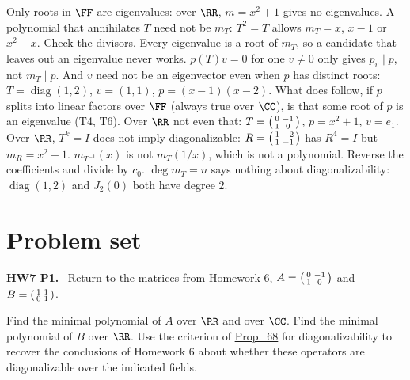 \documentclass[10pt]{scrartcl}
\begin{document}
\begin{trapbox}
  \ii Only roots in $\FF$ are eigenvalues: over $\RR$, $m=x^2+1$ gives no eigenvalues.
  \ii A polynomial that annihilates $T$ need not be $m_T$: $T^2=T$ allows $m_T=x$, $x-1$ or $x^2-x$. Check the divisors.
  \ii Every eigenvalue is a root of $m_T$, so a candidate that leaves out an eigenvalue never works.
  \ii $p(T)v=0$ for one $v\ne0$ only gives $p_v\mid p$, not $m_T\mid p$. And $v$ need not be an eigenvector even when $p$ has distinct roots: $T=\operatorname{diag}(1,2)$, $v=(1,1)$, $p=(x-1)(x-2)$. What does follow, if $p$ splits into linear factors over $\FF$ (always true over $\CC$), is that some root of $p$ is an eigenvalue (T4, T6). Over $\RR$ not even that: $T=\begin{psmallmatrix}0&-1\\1&0\end{psmallmatrix}$, $p=x^2+1$, $v=e_1$.
  \ii Over $\RR$, $T^k=I$ does not imply diagonalizable: $R=\begin{psmallmatrix}1&-2\\1&-1\end{psmallmatrix}$ has $R^4=I$ but $m_R=x^2+1$.
  \ii $m_{T^{-1}}(x)$ is not $m_T(1/x)$, which is not a polynomial. Reverse the coefficients and divide by $c_0$.
  \ii $\deg m_T=n$ says nothing about diagonalizability: $\operatorname{diag}(1,2)$ and $J_2(0)$ both have degree $2$.
\end{trapbox}



\section{Problem set}
\renewcommand{\bigskip}{\medskip}

\begin{prob}
\textbf{HW7 P1. }\ Return to the matrices from Homework 6, $A=\begin{psmallmatrix}0&-1\\1&0\end{psmallmatrix}$ and $B=\begin{psmallmatrix}1&1\\0&1\end{psmallmatrix}$.
\begin{enumerate}[(a)]
  \ii Find the minimal polynomial of $A$ over $\RR$ and over $\CC$.
  \ii Find the minimal polynomial of $B$ over $\RR$.
  \ii Use the criterion of \hyperref[prop-68]{Prop.~68} for diagonalizability to recover the conclusions of Homework 6 about whether these operators are diagonalizable over the indicated fields.
\end{enumerate}
\end{prob}
\end{document}
